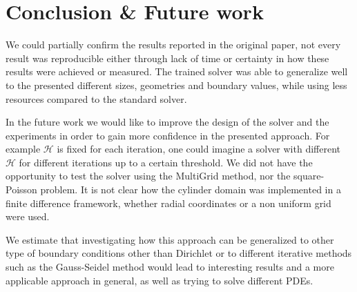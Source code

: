 \documentclass{rescience} %
\begin{document}
\section{Conclusion \& Future work}

We could partially confirm the results reported in the original paper, not every result was reproducible either through lack of time or certainty in how these results were achieved or measured. The trained solver was able to generalize well to the presented different sizes, geometries and boundary values, while using less resources compared to the standard solver.

In the future work we would like to improve the design of the solver and the experiments in order to gain more confidence in the presented approach. For example $\mathcal{H}$ is fixed for each iteration, one could imagine a solver with different $\mathcal{H}$ for different iterations up to a certain threshold. We did not have the opportunity to test the solver using the MultiGrid method, nor the square-Poisson problem.
It is not clear how the cylinder domain was implemented in a finite difference framework, whether radial coordinates or a non uniform grid were used.

We estimate that investigating how this approach can be generalized to other type of boundary conditions other than Dirichlet or to different iterative methods such as the Gauss-Seidel method would lead to interesting results and a more applicable approach in general, as well as trying to solve different PDEs.

\setlength\bibitemsep{0pt}
\printbibliography
\end{document}
